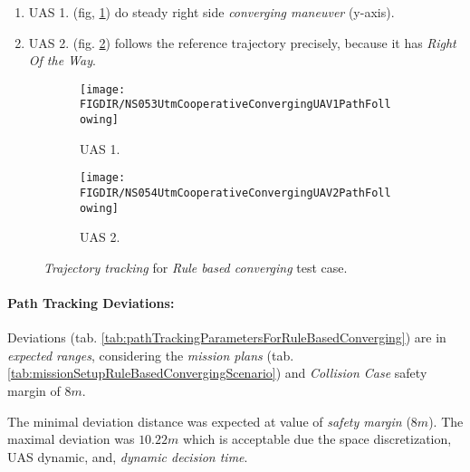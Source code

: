 \begin{enumerate}
    \item UAS 1. (fig, \ref{fig:ruleBasedConvergingUAS1PathTracking}) do steady right side \emph{converging maneuver} (y-axis).
    
    \item UAS 2. (fig. \ref{fig:ruleBasedCovnergingUAS2PathTracking}) follows the reference trajectory precisely, because it has \emph{Right Of the Way}.
\end{enumerate}

\begin{figure}[H]
    \centering
    \begin{subfigure}{0.48\textwidth}
    	\centering
        \texttt{[image: \\FIGDIR/NS053UtmCooperativeConvergingUAV1PathFollowing]}
        \caption{UAS 1.}
        \label{fig:ruleBasedConvergingUAS1PathTracking}
    \end{subfigure}
    \begin{subfigure}{0.48\textwidth}
    	\centering
        \texttt{[image: \\FIGDIR/NS054UtmCooperativeConvergingUAV2PathFollowing]} 
        \caption{UAS 2.}
        \label{fig:ruleBasedCovnergingUAS2PathTracking}
    \end{subfigure}
    \caption{\emph{Trajectory tracking} for \emph{Rule based converging} test case. }
    \label{fig:ruleBasedConvergingTrajectoryTrackingPerformance}
\end{figure}

\paragraph{Path Tracking Deviations:} Deviations (tab. \ref{tab:pathTrackingParametersForRuleBasedConverging}) are in \emph{expected ranges}, considering the \emph{mission plans} (tab. \ref{tab:missionSetupRuleBasedConvergingScenario}) and \emph{Collision Case} safety margin of $8 m$.

The minimal deviation distance was expected at value of \emph{safety margin} ($8 m$). The maximal deviation was $10.22m$ which is acceptable due the space discretization, UAS dynamic, and, \emph{dynamic decision time}.

